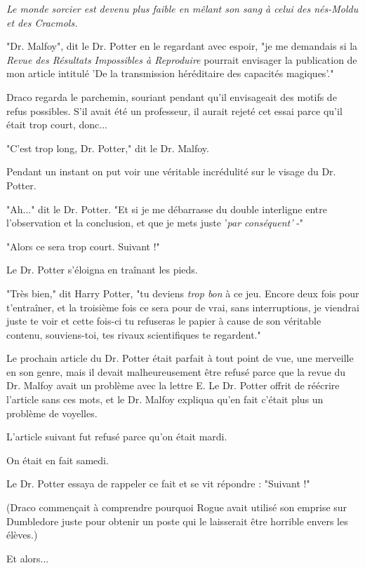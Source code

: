 \begin{center}\emph{Le monde sorcier est devenu plus faible en mêlant son sang à celui des nés-Moldu et des Cracmols.} \end{center}


"Dr. Malfoy", dit le Dr. Potter en le regardant avec espoir, "je me demandais si la \emph{Revue des Résultats Impossibles à Reproduire } pourrait envisager la publication de mon article intitulé 'De la transmission héréditaire des capacités magiques'."

Draco regarda le parchemin, souriant pendant qu'il envisageait des motifs de refus possibles. S'il avait été un professeur, il aurait rejeté cet essai parce qu'il était trop court, donc...

"C'est trop long, Dr. Potter," dit le Dr. Malfoy.

Pendant un instant on put voir une véritable incrédulité sur le visage du Dr. Potter.

"Ah..." dit le Dr. Potter. "Et si je me débarrasse du double interligne entre l'observation et la conclusion, et que je mets juste '\emph{par conséquent' } -"

"Alors ce sera trop court. Suivant !"

Le Dr. Potter s'éloigna en traînant les pieds.

"Très bien," dit Harry Potter, "tu deviens \emph{trop bon}  à ce jeu. Encore deux fois pour t'entraîner, et la troisième fois ce sera pour de vrai, sans interruptions, je viendrai juste te voir et cette fois-ci tu refuseras le papier à cause de son véritable contenu, souviens-toi, tes rivaux scientifiques te regardent."

Le prochain article du Dr. Potter était parfait à tout point de vue, une merveille en son genre, mais il devait malheureusement être refusé parce que la revue du Dr. Malfoy avait un problème avec la lettre E. Le Dr. Potter offrit de réécrire l'article sans ces mots, et le Dr. Malfoy expliqua qu'en fait c'était plus un problème de voyelles.

L'article suivant fut refusé parce qu'on était mardi.

On était en fait samedi.

Le Dr. Potter essaya de rappeler ce fait et se vit répondre : "Suivant !"

(Draco commençait à comprendre pourquoi Rogue avait utilisé son emprise sur Dumbledore juste pour obtenir un poste qui le laisserait être horrible envers les élèves.)

Et alors...

